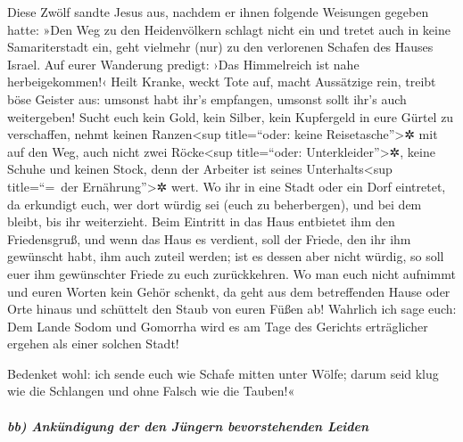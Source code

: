 Diese Zwölf sandte Jesus aus, nachdem er ihnen folgende
Weisungen gegeben hatte: »Den Weg zu den Heidenvölkern schlagt nicht ein
und tretet auch in keine Samariterstadt ein,  geht
vielmehr (nur) zu den verlorenen Schafen des Hauses Israel.
 Auf eurer Wanderung predigt: ›Das Himmelreich ist nahe
herbeigekommen!‹  Heilt Kranke, weckt Tote auf, macht
Aussätzige rein, treibt böse Geister aus: umsonst habt ihr's empfangen,
umsonst sollt ihr's auch weitergeben!  Sucht euch kein
Gold, kein Silber, kein Kupfergeld in eure Gürtel zu verschaffen,
 nehmt keinen Ranzen\textless sup title=``oder: keine
Reisetasche''\textgreater✲ mit auf den Weg, auch nicht zwei
Röcke\textless sup title=``oder: Unterkleider''\textgreater✲, keine
Schuhe und keinen Stock, denn der Arbeiter ist seines
Unterhalts\textless sup title=``=~der Ernährung''\textgreater✲ wert.
 Wo ihr in eine Stadt oder ein Dorf eintretet, da
erkundigt euch, wer dort würdig sei (euch zu beherbergen), und bei dem
bleibt, bis ihr weiterzieht.  Beim Eintritt in das Haus
entbietet ihm den Friedensgruß,  und wenn das Haus es
verdient, soll der Friede, den ihr ihm gewünscht habt, ihm auch zuteil
werden; ist es dessen aber nicht würdig, so soll euer ihm gewünschter
Friede zu euch zurückkehren.  Wo man euch nicht aufnimmt
und euren Worten kein Gehör schenkt, da geht aus dem betreffenden Hause
oder Orte hinaus und schüttelt den Staub von euren Füßen ab!
 Wahrlich ich sage euch: Dem Lande Sodom und Gomorrha
wird es am Tage des Gerichts erträglicher ergehen als einer solchen
Stadt!

 Bedenket wohl: ich sende euch wie Schafe mitten unter
Wölfe; darum seid klug wie die Schlangen und ohne Falsch wie die
Tauben!«

\hypertarget{bb-ankuxfcndigung-der-den-juxfcngern-bevorstehenden-leiden}{%
\subparagraph{bb) Ankündigung der den Jüngern bevorstehenden
Leiden}\label{bb-ankuxfcndigung-der-den-juxfcngern-bevorstehenden-leiden}}

